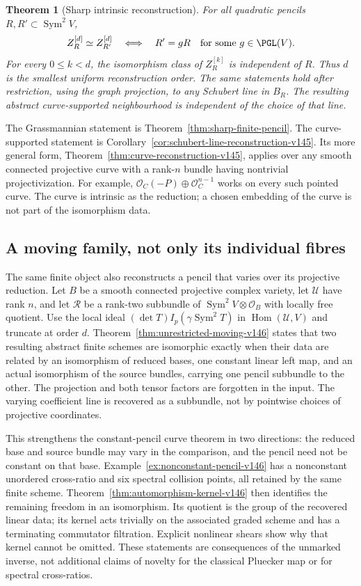 \documentclass[11pt,reqno]{amsart}
\numberwithin{equation}{section}
\newtheorem{theorem}{Theorem}[section]
\theoremstyle{definition}\newtheorem{definition}[theorem]{Definition}
\theoremstyle{remark}\newtheorem{remark}[theorem]{Remark}
\newcommand{\OO}{\mathcal O}\newcommand{\II}{\mathcal I}
\DeclareMathOperator{\Sym}{Sym}\DeclareMathOperator{\Gr}{Gr}
\DeclareMathOperator{\Hom}{Hom}\DeclareMathOperator{\Tot}{Tot}
\begin{document}
\begin{theorem}[Sharp intrinsic reconstruction]
\label{thm:principal-finite-v143}
For all quadratic pencils \(R,R'\subset\Sym^2V\),
\[
 Z_R^{[d]}\simeq Z_{R'}^{[d]}
       \quad\Longleftrightarrow\quad
 R'=gR\quad\text{for some }g\in\PGL(V).
\]
For every \(0\le k<d\), the isomorphism class of \(Z_R^{[k]}\)
is independent of \(R\).  Thus \(d\) is the smallest uniform
reconstruction order.  The same statements hold after restriction,
using the graph projection, to any Schubert line in \(B_R\).
The resulting abstract curve-supported neighbourhood is independent
of the choice of that line.
\end{theorem}

The Grassmannian statement is Theorem~\ref{thm:sharp-finite-pencil}.
The curve-supported statement is
Corollary~\ref{cor:schubert-line-reconstruction-v145}.  Its more general
form, Theorem~\ref{thm:curve-reconstruction-v145}, applies over any
smooth connected projective curve with a rank-\(n\) bundle having
nontrivial projectivization.  For example,
\(\OO_C(-P)\oplus\OO_C^{n-1}\) works on every such pointed curve.
The curve is intrinsic as the reduction; a chosen embedding of the
curve is not part of the isomorphism data.

\subsection{A moving family, not only its individual fibres}
The same finite object also reconstructs a pencil that varies over its
projective reduction.  Let \(B\) be a smooth connected projective
complex variety, let \(\mathcal U\) have rank \(n\), and let \(\mathcal R\) be a rank-two subbundle of
\(\Sym^2V\otimes\OO_B\) with locally free quotient.  Use the local
ideal \((\det T)I_p(\gamma\Sym^2T)\) in
\(\Hom(\mathcal U,V)\) and truncate at order \(d\).
Theorem~\ref{thm:unrestricted-moving-v146} states that two resulting
abstract finite schemes are isomorphic exactly when their data are
related by an isomorphism of reduced bases, one constant linear left
map, and an actual isomorphism of the source bundles, carrying one
pencil subbundle to the other.  The projection and both tensor factors
are forgotten in the input.  The varying coefficient line is recovered
as a subbundle, not by pointwise choices of projective coordinates.

This strengthens the constant-pencil curve theorem in two directions:
the reduced base and source bundle may vary in the comparison, and the
pencil need not be constant on that base.  Example~\ref{ex:nonconstant-pencil-v146}
has a nonconstant unordered cross-ratio and six spectral collision
points, all retained by the same finite scheme.  Theorem~\ref{thm:automorphism-kernel-v146}
then identifies the remaining freedom in an isomorphism.  Its quotient
is the group of the recovered linear data; its kernel acts trivially
on the associated graded scheme and has a terminating commutator
filtration.  Explicit nonlinear shears show why that kernel cannot be
omitted.  These statements are consequences of the unmarked inverse,
not additional claims of novelty for the classical Pluecker map or
for spectral cross-ratios.
\end{document}
